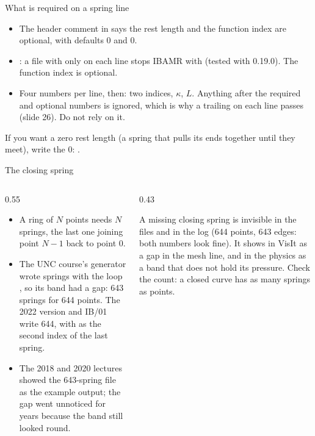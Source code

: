 \documentclass[aspectratio=169,11pt]{beamer}
\begin{document}
\begin{frame}{What is required on a spring line}
\begin{itemize}
  \item The header comment in  says the rest length and the function index are optional, with defaults 0 and 0.
  \item {}: a file with only  on each line stops IBAMR with  (tested with 0.19.0). The function index is optional.
  \item Four numbers per line, then: two indices, $\kappa$, $L$. Anything after the required and optional numbers is ignored, which is why a trailing  on each line passes (slide 26). Do not rely on it.
\end{itemize}
\vspace{2mm}
\begin{punchbox}
\small If you want a zero rest length (a spring that pulls its ends together until they meet), write the 0: .
\end{punchbox}
\end{frame}

\begin{frame}{The closing spring}
\begin{columns}[T,onlytextwidth]
\begin{column}{0.55\textwidth}
\begin{itemize}
  \item A ring of $N$ points needs $N$ springs, the last one joining point $N-1$ back to point 0.
  \item The UNC course's generator wrote  springs with the loop , so its band had a gap: 643 springs for 644 points. The 2022 version and IB/01 write 644, with  as the second index of the last spring.
  \item The 2018 and 2020 lectures showed the 643-spring file as the example output; the gap went unnoticed for years because the band still looked round.
\end{itemize}
\end{column}
\begin{column}{0.43\textwidth}
\begin{punchbox}
\small A missing closing spring is invisible in the files and in the log (644 points, 643 edges: both numbers look fine). It shows in VisIt as a gap in the mesh line, and in the physics as a band that does not hold its pressure. Check the count: a closed curve has as many springs as points.
\end{punchbox}
\end{column}
\end{columns}
\end{frame}
\end{document}
